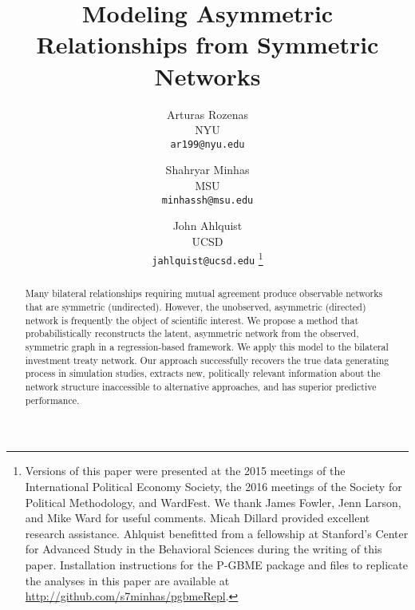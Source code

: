 \documentclass[a4paper, 12pt]{article}
\begin{document}
\title{{\bf Modeling Asymmetric Relationships from Symmetric Networks}}

\author{
  Arturas Rozenas\\
{\small NYU}\\
  {\small \texttt{ar199@nyu.edu}}
\and
  Shahryar Minhas\\
{\small MSU}\\
  {\small \texttt{minhassh@msu.edu}}
  \and
  John Ahlquist\\
{\small UCSD}\\
  {\small \texttt{jahlquist@ucsd.edu}}
\thanks{Versions of this paper were presented at the 2015 meetings of the International Political Economy Society, the 2016 meetings of the Society for Political Methodology, and WardFest.  We thank James Fowler, Jenn Larson, and Mike Ward for useful comments. Micah Dillard provided excellent research assistance.  Ahlquist benefitted from a fellowship at Stanford's Center for Advanced Study in the Behavioral Sciences during the writing of this paper.  Installation instructions for the P-GBME package and files to replicate the analyses in this paper are available at \url{http://github.com/s7minhas/pgbmeRepl}.}}

\maketitle 
\thispagestyle{empty}

\bigskip

\begin{abstract}
 \noindent Many bilateral relationships requiring mutual agreement produce observable networks that are symmetric (undirected). However, the unobserved, asymmetric (directed) network is frequently the object of scientific interest. We propose a method that probabilistically reconstructs the latent, asymmetric network from the observed, symmetric graph in a regression-based framework. We apply this model to the bilateral investment treaty network. Our approach successfully recovers the true data generating process in simulation studies, extracts new, politically relevant information about the network structure inaccessible to alternative approaches, and has superior predictive performance. 
\end{abstract}

\clearpage

\singlespacing






\singlespacing


\end{document}
